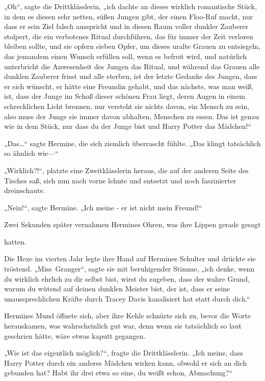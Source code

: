 {„Oh“, sagte die Drittklässlerin, „ich dachte an dieses wirklich romantische Stück, in dem es diesen sehr netten, süßen Jungen gibt, der einen Floo-Ruf macht, nur dass er sein Ziel falsch ausspricht und in diesen Raum voller dunkler Zauberer stolpert, die ein verbotenes Ritual durchführen, das für immer der Zeit verloren bleiben sollte, und sie opfern sieben Opfer, um dieses uralte Grauen zu entsiegeln, das jemandem einen Wunsch erfüllen soll, wenn es befreit wird, und natürlich unterbricht die Anwesenheit des Jungen das Ritual, und während das Grauen alle dunklen Zauberer frisst und alle sterben, ist der letzte Gedanke des Jungen, dass er sich wünscht, er hätte eine Freundin gehabt, und das nächste, was man weiß, ist, dass der Junge im Schoß dieser schönen Frau liegt, deren Augen in einem schrecklichen Licht brennen, nur versteht sie nichts davon, ein Mensch zu sein, also muss der Junge sie immer davon abhalten, Menschen zu essen. Das ist genau wie in dem Stück, nur dass du der Junge bist und Harry Potter das Mädchen!“

„Das…“ sagte Hermine, die sich ziemlich überrascht fühlte. „Das klingt tatsächlich so ähnlich wie—“

„Wirklich?!“, platzte eine Zweitklässlerin heraus, die auf der anderen Seite des Tisches saß, sich nun nach vorne lehnte und entsetzt und noch faszinierter dreinschaute.

„Nein!“, sagte Hermine. „Ich meine - er ist nicht mein Freund!“

Zwei Sekunden später vernahmen Hermines Ohren, was ihre Lippen gerade gesagt

hatten.

Die Hexe im vierten Jahr legte ihre Hand auf Hermines Schulter und drückte sie tröstend. „Miss~Granger“, sagte sie mit beruhigender Stimme, „ich denke, wenn du wirklich ehrlich zu dir selbst bist, wirst du zugeben, dass der wahre Grund, warum du wütend auf deinen dunklen Meister bist, der ist, dass er seine unaussprechlichen Kräfte durch Tracey Davis kanalisiert hat statt durch dich.“

Hermines Mund öffnete sich, aber ihre Kehle schnürte sich zu, bevor die Worte herauskamen, was wahrscheinlich gut war, denn wenn sie tatsächlich so laut geschrien hätte, wäre etwas kaputt gegangen.

„Wie ist das eigentlich möglich?“, fragte die Drittklässlerin. „Ich meine, dass Harry Potter durch ein anderes Mädchen wirken kann, obwohl er sich an dich gebunden hat? Habt ihr drei etwa so eine, du weißt schon, Abmachung?“

}
